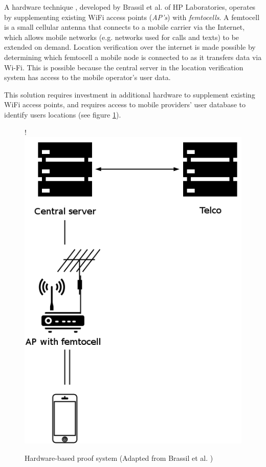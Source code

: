 A hardware technique \cite{brassil}, developed by Brassil et al. of HP Laboratories, operates by supplementing existing WiFi access points (\textit{AP's}) with \textit{femtocells}. A femtocell \cite{femtocell} is a small cellular antenna that connects to a mobile carrier via the Internet, which allows mobile networks (e.g. networks used for calls and texts) to be extended on demand. Location verification over the internet is made possible by determining which femtocell a mobile node is connected to as it transfers data via Wi-Fi. This is possible because the central server in the location verification system has access to the mobile operator's user data.

This solution requires investment in additional hardware to supplement existing WiFi access points, and requires access to mobile providers' user database to identify users locations (see figure \ref{fig:hp_labs}).

\begin{figure}[H]
\begin{center}
 {!} {\includegraphics{diagrams/hp_paper.png}}
\caption{Hardware-based proof system (Adapted from Brassil et al. \cite{brassil})}
\label{fig:hp_labs}
\end{center}
\end{figure}


